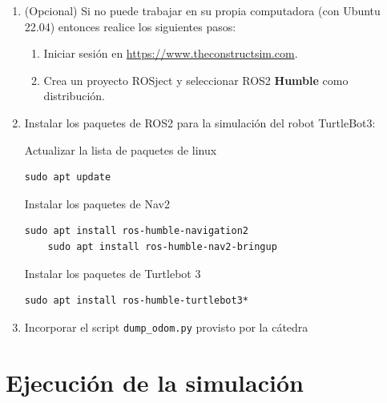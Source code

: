 \documentclass[tp]{lcc}
\begin{document}
\begin{enumerate}

\item (Opcional) Si no puede trabajar en su propia computadora (con Ubuntu 22.04) entonces realice los siguientes pasos:

\begin{enumerate}
	\item Iniciar sesión en \url{https://www.theconstructsim.com}.
	\item Crea un proyecto ROSject y seleccionar ROS2 {\bf Humble} como distribución.
\end{enumerate}


\item Instalar los paquetes de ROS2 para la simulación del robot TurtleBot3:

Actualizar la lista de paquetes de linux
\begin{lstlisting}[style=bash] 
    sudo apt update
\end{lstlisting}

Instalar los paquetes de Nav2 
\begin{lstlisting}[style=bash] 
	sudo apt install ros-humble-navigation2
	sudo apt install ros-humble-nav2-bringup
\end{lstlisting}

Instalar los paquetes de Turtlebot 3
\begin{lstlisting}[style=bash] 
	sudo apt install ros-humble-turtlebot3*
\end{lstlisting}

	\item Incorporar el script \lstinline[style=bash]{dump_odom.py} provisto por la cátedra
	
\end{enumerate}

\section{Ejecución de la simulación}
\end{document}
